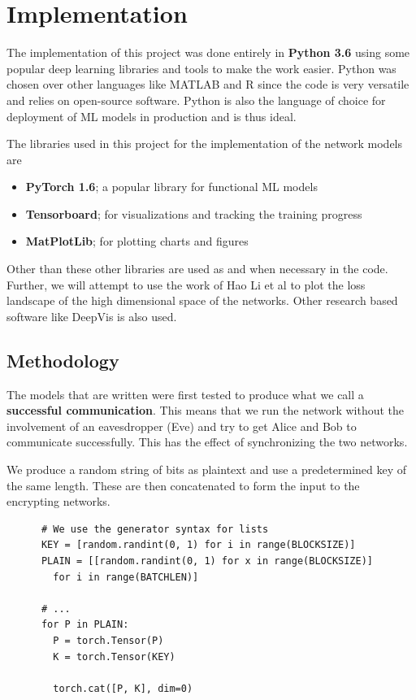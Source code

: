 \documentclass[a4paper]{article}
\begin{document}
  \newpage 
  \section{Implementation} \label{sec:implementation}
  The implementation of this project was done entirely in {\bfseries Python 3.6} using some popular 
  deep learning libraries and tools to make the work easier. Python was chosen over other languages
  like MATLAB and R since the code is very versatile and relies on open-source software.
  Python is also the language of choice for deployment of ML models in production and is thus ideal.

  The libraries used in this project for the implementation of the network models are
  \begin{itemize}
    \item {\bfseries PyTorch 1.6}; a popular library for functional ML models
    \item {\bfseries Tensorboard}; for visualizations and tracking the training progress
    \item {\bfseries MatPlotLib}; for plotting charts and figures
  \end{itemize}

  Other than these other libraries are used as and when necessary in the code. Further, we will 
  attempt to use the work of Hao Li et al\cite{visualloss} to plot the loss landscape of the 
  high dimensional space of the networks. Other research based 
  software like DeepVis\cite{deepvis} is also used.

    \subsection{Methodology}
    The models that are written were first tested to produce what we call a \\
    {\bfseries successful communication}.
    This means that we run the network without the involvement of an eavesdropper (Eve) and try to
    get Alice and Bob to communicate successfully. This has the effect of synchronizing the two networks.

    We produce a random string of bits as plaintext and use a predetermined key of the same length. 
    These are then concatenated to form the input to the encrypting networks.

    \begin{lstlisting}
      # We use the generator syntax for lists
      KEY = [random.randint(0, 1) for i in range(BLOCKSIZE)]
      PLAIN = [[random.randint(0, 1) for x in range(BLOCKSIZE)] 
        for i in range(BATCHLEN)]

      # ...
      for P in PLAIN:
        P = torch.Tensor(P)
        K = torch.Tensor(KEY)

        torch.cat([P, K], dim=0)
    \end{lstlisting}
\end{document}
